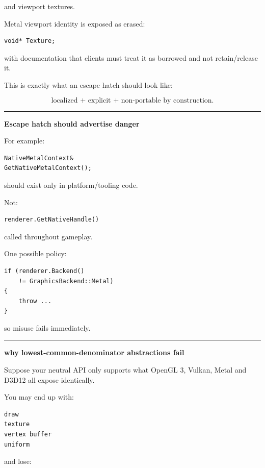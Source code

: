 and viewport textures.

Metal viewport identity is exposed as erased:

\begin{verbatim}
void* Texture;
\end{verbatim}

with documentation that clients must treat it as borrowed and not retain/release it.

This is exactly what an escape hatch should look like:

\[
\boxed{
\text{localized + explicit + non-portable by construction}.
}
\]

\begin{center}\rule{0.5\linewidth}{0.5pt}\end{center}

\textbf{Escape hatch should advertise danger}

For example:

\begin{verbatim}
NativeMetalContext&
GetNativeMetalContext();
\end{verbatim}

should exist only in platform/tooling code.

Not:

\begin{verbatim}
renderer.GetNativeHandle()
\end{verbatim}

called throughout gameplay.

One possible policy:

\begin{verbatim}
if (renderer.Backend()
    != GraphicsBackend::Metal)
{
    throw ...
}
\end{verbatim}

so misuse fails immediately.

\begin{center}\rule{0.5\linewidth}{0.5pt}\end{center}

\textbf{why lowest-common-denominator abstractions fail}

Suppose your neutral API only supports what OpenGL 3, Vulkan, Metal and D3D12 all expose identically.

You may end up with:

\begin{verbatim}
draw
texture
vertex buffer
uniform
\end{verbatim}

and lose:

